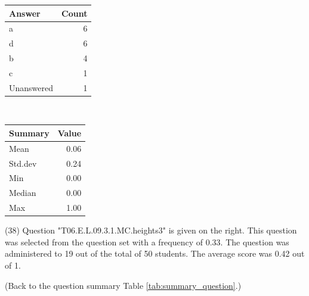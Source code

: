 \documentclass[12pt,english,nohyper]{tufte-handout}\usepackage[]{graphicx}\usepackage[]{color}
\begin{document}
\begin{center}%
\begin{tabular}{lr}
  \hline
Answer & Count \\ 
  \hline
a &   6 \\ 
  d &   6 \\ 
  b &   4 \\ 
  c &   1 \\ 
  Unanswered &   1 \\ 
   \hline
\end{tabular}
~~~~~~~~%
\begin{tabular}{lr}
  \hline
Summary & Value \\ 
  \hline
Mean & 0.06 \\ 
  Std.dev & 0.24 \\ 
  Min & 0.00 \\ 
  Median & 0.00 \\ 
  Max & 1.00 \\ 
   \hline
\end{tabular}
\end{center}\newpage{} (38) Question "T06.E.L.09.3.1.MC.heights3" is given on the right. This question was selected from the question set with a frequency of 0.33. The question was administered to 19 out of the total of 50 students. The average score was 0.42 out of 1.

 (Back to the question summary Table \ref{tab:summary_question}.)
\end{document}
